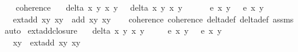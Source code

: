 \begin{isabellebody}
\endisatagproof
{\isafoldproof}%
%
\isadelimproof
\isanewline
%
\endisadelimproof
\ \ \isanewline
{}\isamarkupfalse%
\ coherence{\isacharcolon}\isanewline
\ \ \ {\isachardoublequoteopen}delta\ x{}\ y{}\ x{}\ y{}\ {\isasymnoteq}\ {}{\isachardoublequoteclose}\ {\isachardoublequoteopen}delta{\isacharprime}\ x{}\ y{}\ x{}\ y{}\ {\isasymnoteq}\ {}{\isachardoublequoteclose}\ \isanewline
\ \ \ {\isachardoublequoteopen}e{\isacharprime}\ x{}\ y{}\ {\isacharequal}\ {}{\isachardoublequoteclose}\ {\isachardoublequoteopen}e{\isacharprime}\ x{}\ y{}\ {\isacharequal}\ {}{\isachardoublequoteclose}\isanewline
\ \ \ {\isachardoublequoteopen}ext{\isacharunderscore}add\ {\isacharparenleft}x{}{\isacharcomma}y{}{\isacharparenright}\ {\isacharparenleft}x{}{\isacharcomma}y{}{\isacharparenright}\ {\isacharequal}\ add\ {\isacharparenleft}x{}{\isacharcomma}y{}{\isacharparenright}\ {\isacharparenleft}x{}{\isacharcomma}y{}{\isacharparenright}{\isachardoublequoteclose}\isanewline
%
\isadelimproof
\ \ %
\endisadelimproof
%
\isatagproof
{}\isamarkupfalse%
\ coherence{\isacharunderscore}{}\ coherence{\isacharunderscore}{}\ delta{\isacharunderscore}def\ delta{\isacharprime}{\isacharunderscore}def\ assms\ \isamarkupfalse%
\ auto%
\endisatagproof
{\isafoldproof}%
%
\isadelimproof
\isanewline
%
\endisadelimproof
\isanewline
{}\isamarkupfalse%
\ ext{\isacharunderscore}add{\isacharunderscore}closure{\isacharcolon}\isanewline
\ \ \ {\isachardoublequoteopen}delta{\isacharprime}\ x{}\ y{}\ x{}\ y{}\ {\isasymnoteq}\ {}{\isachardoublequoteclose}\isanewline
\ \ \ {\isachardoublequoteopen}e{\isacharprime}\ x{}\ y{}\ {\isacharequal}\ {}{\isachardoublequoteclose}\ {\isachardoublequoteopen}e{\isacharprime}\ x{}\ y{}\ {\isacharequal}\ {}{\isachardoublequoteclose}\ \isanewline
\ \ \ {\isachardoublequoteopen}{\isacharparenleft}x{}{\isacharcomma}y{}{\isacharparenright}\ {\isacharequal}\ ext{\isacharunderscore}add\ {\isacharparenleft}x{}{\isacharcomma}y{}{\isacharparenright}\ {\isacharparenleft}x{}{\isacharcomma}y{}{\isacharparenright}{\isachardoublequoteclose}\isanewline

\end{isabellebody}
